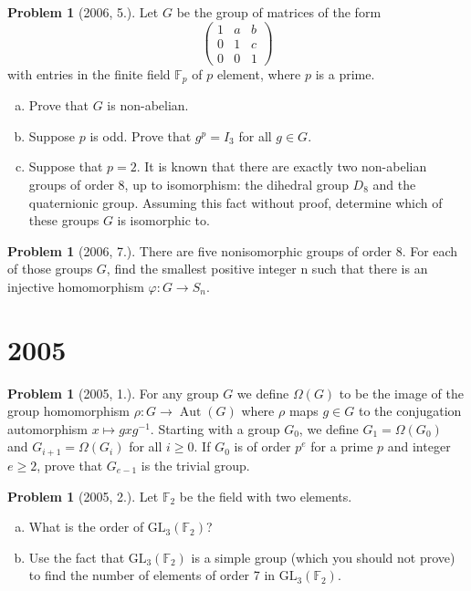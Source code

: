 \documentclass{article}
\newcommand{\inv}{^{-1}}
\newcommand{\<}{\langle} %
\renewcommand{\>}{\rangle} %
\DeclareMathOperator{\Aut}{Aut}
\theoremstyle{plain}
\theoremstyle{remark}
\theoremstyle{definition}
\newtheorem{examproblem}[equation]{Problem}
\begin{document}
\begin{examproblem}[2006, 5.]
	Let $G$ be the group of matrices of the form
	$$
	\begin{pmatrix}
		1 & a & b\\
		0 & 1 & c\\
		0 & 0 & 1
	\end{pmatrix}
	$$
	with entries in the finite field $\mathbb F_p$ of $p$ element, where
	$p$ is a prime.
	\begin{enumerate}[(a)]
		\item Prove that $G$ is non-abelian.
		\item Suppose $p$ is odd. Prove that $g^p=I_3$ for all $g\in G$.
		\item Suppose that $p=2$. It is known that there are exactly
			two non-abelian groups of order 8, up to isomorphism:
			the dihedral group $D_8$ and the quaternionic group.
			Assuming this fact without proof, determine which
			of these groups $G$ is isomorphic to.
	\end{enumerate}
\end{examproblem}


\begin{examproblem}[2006, 7.]
	There are five nonisomorphic groups of order 8. For
	each of those groups $G$, find the smallest positive integer n such that there is an
	injective homomorphism $\varphi: G\rightarrow S_n$.
\end{examproblem}

\newpage
\section{2005}

\begin{examproblem}[2005, 1.]
	For any group $G$ we define $\Omega(G)$ to be the image of the group
	homomorphism $\rho:G\rightarrow\Aut(G)$ where $\rho$ maps
	$g\in G$ to the conjugation automorphism $x\mapsto gxg\inv$.
	Starting with a group $G_0$, we define $G_1=\Omega(G_0)$ and
	$G_{i+1}=\Omega(G_i)$ for all $i\geq 0$. If $G_0$ is of order
	$p^e$ for a prime $p$ and integer $e\geq 2$, prove that $G_{e-1}$
	is the trivial group.
\end{examproblem}

\begin{examproblem}[2005, 2.]
	Let $\mathbb F_2$ be the field with two elements.
	\begin{enumerate}[(a)]
		\item What is the order of $\text{GL}_3(\mathbb F_2)$?
		\item Use the fact that $\text{GL}_3(\mathbb F_2)$ is a simple group
			(which you should not prove) to find the number
			of elements of order 7 in $\text{GL}_3(\mathbb F_2)$.
	\end{enumerate}
\end{examproblem}
\end{document}

